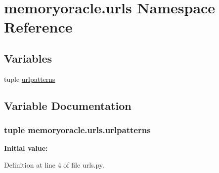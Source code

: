 \hypertarget{namespacememoryoracle_1_1urls}{}\section{memoryoracle.\+urls Namespace Reference}
\label{namespacememoryoracle_1_1urls}
\subsection*{Variables}
\begin{DoxyCompactItemize}
\item 
tuple \hyperlink{namespacememoryoracle_1_1urls_a8120adbacd005e070fd504f253e9e904}{urlpatterns}
\end{DoxyCompactItemize}


\subsection{Variable Documentation}
\hypertarget{namespacememoryoracle_1_1urls_a8120adbacd005e070fd504f253e9e904}{}
\subsubsection[{urlpatterns}]{\setlength{\rightskip}{0pt plus 5cm}tuple memoryoracle.\+urls.\+urlpatterns}\label{namespacememoryoracle_1_1urls_a8120adbacd005e070fd504f253e9e904}
{\bfseries Initial value\+:}


Definition at line 4 of file urls.\+py.

